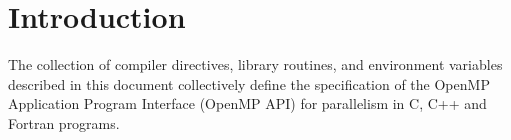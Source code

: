 %
%
%
%
%
%
%
%
%
%
%
%
%

\chapter{Introduction}
\label{chap:introduction}
The collection of compiler directives, library routines, and environment
variables described in this document collectively define the specification of
the OpenMP Application Program Interface (OpenMP API) for parallelism in C, C++
and Fortran programs.

